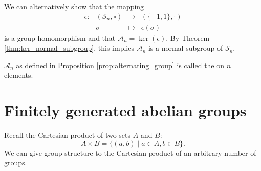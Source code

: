 We can alternatively show that the mapping
\begin{equation*}
    \begin{array}{rccc}
        \epsilon: & (\mathcal{S}_n,\circ) & \to & (\{-1,1\},\cdot) \\
        & \sigma & \mapsto & \epsilon(\sigma)
    \end{array}
\end{equation*}
is a group homomorphism and that $ \mathcal{A}_n=\ker(\epsilon) $. By Theorem \ref{thm:ker_normal_subgroup}, this implies $ \mathcal{A}_n $ is a normal subgroup of $ \mathcal{S}_n $.

\begin{defn}
$ \mathcal{A}_n $ as defined in Proposition \ref{prop:alternating_group} is called the  on $ n $ elements.
\end{defn}

\section{Finitely generated abelian groups}

Recall the Cartesian product of two sets $ A $ and $ B $:
\begin{equation*}
    A\times B=\{(a,b)\mid a\in A,b\in B\}.
\end{equation*}
We can give group structure to the Cartesian product of an arbitrary number of groups.


